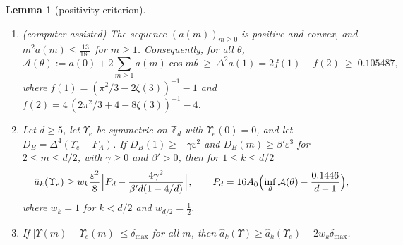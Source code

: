 \documentclass[11pt]{amsart}
\newtheorem{lemma}[theorem]{Lemma}
\theoremstyle{definition}
\theoremstyle{remark}
\numberwithin{equation}{section}
\newcommand{\Z}{\mathbb{Z}}
\begin{document}
\begin{lemma}[positivity criterion]\label{lem:P}
\begin{enumerate}
\item \emph{(computer-assisted)} The sequence $(a(m))_{m\ge0}$ is positive and convex, and $m^2a(m)\le\frac{13}{180}$ for $m\ge1$.
Consequently, for all $\theta$,
\[
\mathcal A(\theta):=a(0)+2\sum_{m\ge1}a(m)\cos m\theta\ \ge\ \Delta^2a(1)=2f(1)-f(2)\ \ge\ 0.105487,
\]
where $f(1)=(\pi^2/3-2\zeta(3))^{-1}-1$ and $f(2)=4\,(2\pi^2/3+4-8\zeta(3))^{-1}-4$.
\item Let $d\ge5$, let $\Upsilon_e$ be symmetric on $\Z_d$ with $\Upsilon_e(0)=0$, and let $D_B=\Delta^4(\Upsilon_e-F_A)$. If $D_B(1)\ge-\gamma\varepsilon^2$
and $D_B(m)\ge\beta'\varepsilon^3$ for $2\le m\le d/2$, with $\gamma\ge0$ and $\beta'>0$, then for $1\le k\le d/2$
\[
\hat a_k(\Upsilon_e)\ge w_k\frac{\varepsilon^2}8\Bigl[P_d-\frac{4\gamma^2}{\beta'd(1-4/d)}\Bigr],\qquad P_d=16A_0\Bigl(\inf_\theta\mathcal A(\theta)-\frac{0.1446}{d-1}\Bigr),
\]
where $w_k=1$ for $k<d/2$ and $w_{d/2}=\frac12$.
\item If $|\Upsilon(m)-\Upsilon_e(m)|\le\delta_{\max}$ for all $m$, then $\hat a_k(\Upsilon)\ge\hat a_k(\Upsilon_e)-2w_k\delta_{\max}$.
\end{enumerate}
\end{lemma}
\end{document}
